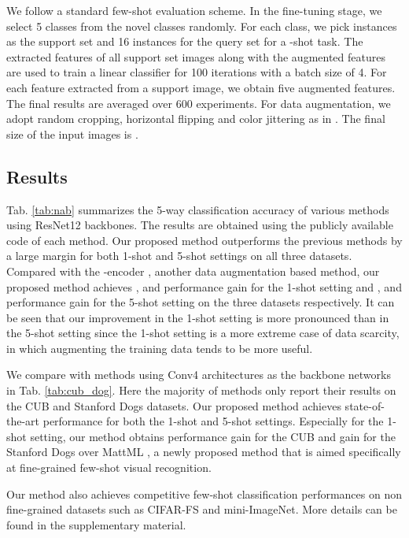 \documentclass[10pt,twocolumn,letterpaper]{article}
\begin{document}
      We follow a standard few-shot evaluation scheme. 
      In the fine-tuning stage, we select 5 classes from the novel classes randomly. 
      For each class, we pick  instances as the support set and 16
      instances for the query set for a -shot task. The extracted features of all support set images along
      with the augmented features are used to train a linear classifier for 100 iterations with a batch size
      of 4. 
      For each feature extracted from a support image, we obtain five augmented features. The final
      results are averaged over 600 experiments.
      For data augmentation, we adopt random cropping, horizontal flipping and color jittering as in \cite{closer-look}. The final
      size of the input images is  .
      
       \subsection{Results} 
    Tab. \ref{tab:nab} summarizes the 5-way classification accuracy of  various methods using ResNet12 backbones.
The results are obtained using the publicly available code of each method.
Our proposed method outperforms the previous methods by a large margin for both 1-shot and 5-shot settings on all three datasets.
Compared with the -encoder \cite{delta-encoder}, another data augmentation based method, our proposed method achieves ,  and  performance gain for the  1-shot setting and ,  and  performance gain for the 5-shot setting on the three datasets respectively.
It can be seen that our improvement in the 1-shot setting is more pronounced than in the 5-shot setting since the 1-shot setting is a more extreme case of data scarcity, in which augmenting the training data tends to be more useful. 
    
    We compare with methods using Conv4 architectures as the backbone networks in Tab. \ref{tab:cub_dog}. Here the majority of methods only report their results on the CUB and Stanford Dogs datasets. 
Our proposed method achieves state-of-the-art performance for both the 1-shot and 5-shot settings.
Especially for the 1-shot setting, our method obtains  performance gain for the CUB and  gain for the Stanford Dogs over MattML \cite{MattML}, a newly proposed method that is aimed specifically at fine-grained few-shot visual recognition. 
    
    Our method also achieves competitive few-shot classification performances on non fine-grained datasets such as CIFAR-FS\cite{Bertinetto2019MetalearningWD} and mini-ImageNet\cite{matchingnet,meta_learn_lstm}. More details can be found in the supplementary material.
   
\end{document}
